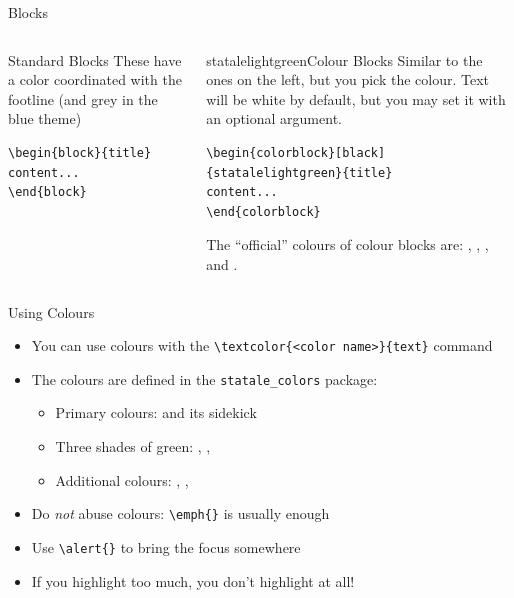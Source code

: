 \begin{frame}[fragile]{Blocks}
\begin{columns} %
\begin{column}{0.3\textwidth}
\begin{block}{Standard Blocks}
These have a color coordinated with the footline (and grey in the blue theme)
\begin{verbatim}
\begin{block}{title}
content...
\end{block}
\end{verbatim}
\end{block}
\end{column}
\begin{column}{0.7\textwidth}
\begin{colorblock}[black]{statalelightgreen}{Colour Blocks}
Similar to the ones on the left, but you pick the colour. Text will be white by default, but you may set it with an optional argument.
\small
\begin{verbatim}
\begin{colorblock}[black]{statalelightgreen}{title}
content...
\end{colorblock}
\end{verbatim}
\end{colorblock}
The ``official'' colours of colour blocks are: , 
, , and 
.
\end{column}
\end{columns}
\end{frame}


\footlinecolor{}
\begin{frame}[fragile]{Using Colours}
\begin{itemize}[<alert@2>]
  \item You can use colours with the
        \verb|\textcolor{<color name>}{text}| command
  \item The colours are defined in the \texttt{statale\_colors} package:
  \begin{itemize}
  \item Primary colours:  and its sidekick 
  \item Three shades of green: , 
  , 
  \item Additional colours: , , 
  \end{itemize}
  \item Do \emph{not} abuse colours: \verb|\emph{}| is usually enough
  \item Use \verb|\alert{}| to bring the \alert<2->{focus} somewhere
  \item <2- | alert@2> If you highlight too much, you don't highlight at all!
\end{itemize}
\end{frame}

